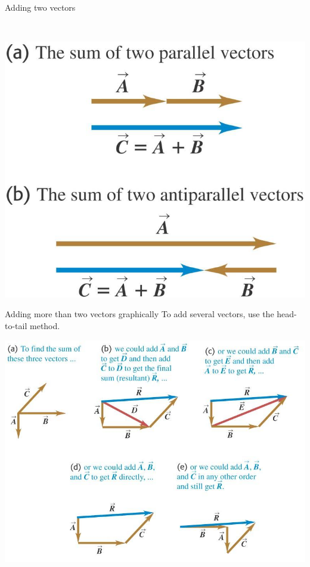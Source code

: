 \documentclass[18pt]{LectMechanics}
\begin{document}
\begin{frame}{Adding two vectors}{}
\begin{center}
\begin{minipage}{.3\textwidth}
		\end{minipage}\
		\begin{minipage}{.3\textwidth}
			\includegraphics[width=\linewidth]{Vector_Addition_2}
		\end{minipage}
	\end{center}
\end{frame}


\begin{frame}[t]{Adding more than two vectors graphically}{}
	To add several vectors, use the head-to-tail method.
	\begin{center}
		\includegraphics[width=0.7\linewidth]{Vector_Addition_3}
	\end{center}
\end{frame}
\end{document}
